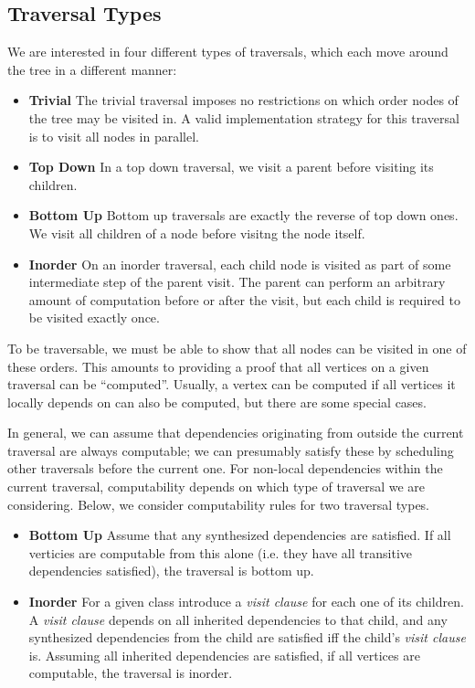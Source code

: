 \documentclass[10pt]{article}
\begin{document}
\subsection{Traversal Types}
We are interested in four different types of traversals, which each move around the tree in a different manner:
\begin{itemize}
    \item \textbf{Trivial} The trivial traversal imposes no restrictions on which order nodes of the tree may be visited in. A valid implementation strategy for this traversal is to visit all nodes in parallel.
    \item \textbf{Top Down} In a top down traversal, we visit a parent before visiting its children. 
    \item \textbf{Bottom Up} Bottom up traversals are exactly the reverse of top down ones. We visit all children of a node before visitng the node itself.
    \item \textbf{Inorder} On an inorder traversal, each child node is visited as part of some intermediate step of the parent visit. The parent can perform an arbitrary amount of computation before or after the visit, but each child is required to be visited exactly once.
\end{itemize}

To be traversable, we must be able to show that all nodes can be visited in one of these orders. This amounts to providing a proof that all vertices on a given traversal can be ``computed''. Usually, a vertex can be computed if all vertices it locally depends on can also be computed, but there are some special cases.

In general, we can assume that dependencies originating from outside the current traversal are always computable; we can presumably satisfy these by scheduling other traversals before the current one. For non-local dependencies within the current traversal, computability depends on which type of traversal we are considering. Below, we consider computability rules for two traversal types.

\begin{itemize}
    \item \textbf{Bottom Up} Assume that any synthesized dependencies are satisfied. If all verticies are computable from this alone (i.e. they have all transitive dependencies satisfied), the traversal is bottom up.
    \item \textbf{Inorder} For a given class introduce a \emph{visit clause} for each one of its children. A \emph{visit clause} depends on all inherited dependencies to that child, and any synthesized dependencies from the child are satisfied iff the child's \emph{visit clause} is. Assuming all inherited dependencies are satisfied, if all vertices are computable, the traversal is inorder.
\end{itemize}
\end{document}
